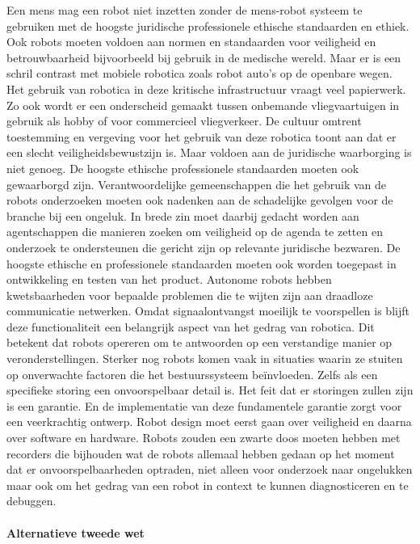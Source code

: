\documentclass[11pt]{report}
\begin{document}
Een mens mag een robot niet inzetten zonder de mens-robot systeem te gebruiken met  de hoogste juridische professionele ethische standaarden en ethiek.
Ook robots moeten voldoen aan normen en standaarden voor veiligheid en betrouwbaarheid bijvoorbeeld bij gebruik in de medische wereld.
Maar er is een schril contrast met mobiele robotica zoals robot auto’s op de openbare wegen. Het gebruik van robotica in deze kritische infrastructuur vraagt veel papierwerk. Zo ook wordt er een onderscheid gemaakt tussen onbemande vliegvaartuigen in gebruik als hobby of voor commercieel vliegverkeer. De cultuur omtrent toestemming en vergeving voor het gebruik van deze robotica toont aan dat er een slecht veiligheidsbewustzijn is.
Maar voldoen aan de juridische waarborging is niet genoeg. De hoogste ethische professionele standaarden moeten ook gewaarborgd zijn. Verantwoordelijke gemeenschappen die het gebruik van de robots onderzoeken moeten ook nadenken aan de schadelijke gevolgen voor de branche bij een ongeluk. In brede zin moet daarbij gedacht worden aan agentschappen die manieren zoeken om veiligheid op de agenda te zetten en onderzoek te ondersteunen die gericht zijn op relevante juridische bezwaren.
De hoogste ethische en professionele standaarden moeten ook worden toegepast in ontwikkeling en testen van het product. Autonome robots hebben kwetsbaarheden voor bepaalde problemen die te wijten zijn aan draadloze communicatie netwerken. Omdat signaalontvangst moeilijk te voorspellen is blijft deze functionaliteit een belangrijk aspect van het gedrag van robotica. Dit betekent dat robots opereren om te antwoorden op een verstandige manier op veronderstellingen. Sterker nog robots komen vaak in situaties waarin ze stuiten op onverwachte factoren die het bestuurssysteem beïnvloeden. Zelfs als een specifieke storing een onvoorspelbaar detail is. Het feit dat er storingen zullen zijn is een garantie. En de implementatie van deze fundamentele garantie zorgt voor een veerkrachtig ontwerp.
Robot design moet eerst gaan over veiligheid en daarna over software en hardware. Robots zouden een zwarte doos moeten hebben met recorders die bijhouden wat de robots allemaal hebben gedaan op het moment dat er onvoorspelbaarheden optraden, niet alleen voor onderzoek naar ongelukken maar ook om het gedrag van een robot in context te kunnen diagnosticeren en te debuggen.
\paragraph{Alternatieve tweede wet}
\end{document}
